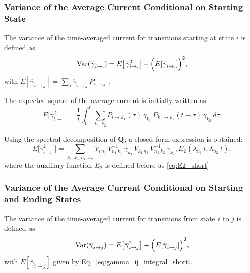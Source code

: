 \documentclass[pdflatex,sn-nature]{sn-jnl}%
\begin{document}
\subsubsection{Variance of the Average Current Conditional on Starting State} \label{sec:var_current_calc}

The variance of the time-averaged current for transitions starting at state \(i\) is defined as
\begin{equation}
\mathrm{Var}(\overline{\gamma}_{i\rightarrow .}) = E\bigl[\overline{\gamma}_{i\rightarrow .}^2\bigr] - \Bigl(E[\overline{\gamma}_{i\rightarrow .}]\Bigr)^2,
\label{eq:variance_start_gamma_short}
	\end{equation}
	with \(E[\overline{\gamma}_{i\rightarrow j}]= \sum_{j} \overline{\gamma}_{i \rightarrow j} \, P_{i\rightarrow j} \) .

The expected square of the average current is initially written as
\begin{equation}
E\bigl[\overline{\gamma}_{i\rightarrow .}^2\bigr] = \frac{1}{t} \int_0^t\sum_{k_1,k_2} P_{i\rightarrow k_1}(\tau)\,\gamma_{k_1}\,P_{k_1\rightarrow k_2}(t-\tau)\,\gamma_{k_2}\,d\tau.
\label{eq:expected_square_integral_short}
\end{equation}

Using the spectral decomposition of \(\mathbf{Q}\), a closed-form expression is obtained:
	\begin{equation}
	E\bigl[\overline{\gamma}_{i\rightarrow .}^2\bigr] =  \sum_{k_1,k_2,n_1,n_2} V_{i\, n_1}\,V^{-1}_{n_1\, k_1}\,\gamma_{k_1}\,V_{k_1\, n_2}\,V^{-1}_{n_2\, k_2}\,\gamma_{k_2},E_2(\lambda_{n_1}\,t,\lambda_{n_2}\,t),
\label{eq:expected_square_closed_short}
\end{equation}
where the auxiliary function \(E_2\) is defined before as \ref{eq:E2_short}

\subsubsection{Variance of the Average Current Conditional on Starting and Ending States} \label{sec:var_current_calc}

The variance of the time-averaged current for transitions from state \(i\) to \(j\) is defined as
\begin{equation}
\mathrm{Var}(\overline{\gamma}_{i\rightarrow j}) = E\bigl[\overline{\gamma}_{i\rightarrow j}^2\bigr] - \Bigl(E[\overline{\gamma}_{i\rightarrow j}]\Bigr)^2,
\label{eq:variance_gamma_short}
	\end{equation}
	with \(E[\overline{\gamma}_{i\rightarrow j}]\) given by Eq.~\ref{eq:gamma_ij_integral_short}.
\end{document}
